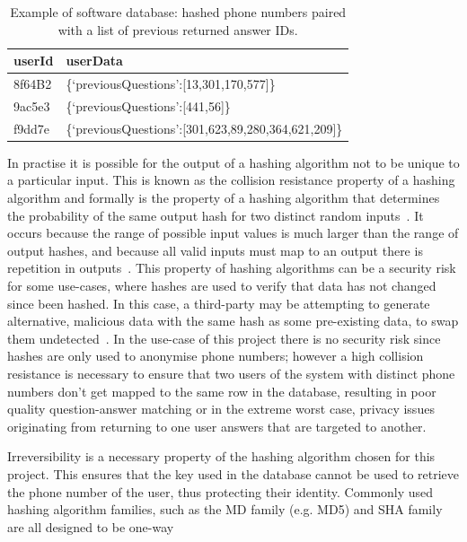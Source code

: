 \documentclass[authoryearcitations]{UoYCSproject}
\begin{document}
\begin{table}
\begin{center}
    \begin{tabular}{| l | l |}
    \hline
    userId & userData \\ \hline
    8f64B2 & \{‘previousQuestions’:[13,301,170,577]\} \\ \hline
    9ac5e3 & \{‘previousQuestions’:[441,56]\} \\ \hline
    f9dd7e & \{‘previousQuestions’:[301,623,89,280,364,621,209]\} \\
    \hline
    \end{tabular}
    \caption{Example of software database: hashed phone numbers paired with a list of previous returned answer IDs. }
    \label{table:hashDatabase}
\end{center}
\end{table}

In practise it is possible for the output of a hashing algorithm not to be unique to a particular input.  This is known as the collision resistance property of a hashing algorithm and formally is the property of a hashing algorithm that determines the probability of the same output hash for two distinct random inputs~\cite{mitCryptographyMd5}.  It occurs because the range of possible input values is much larger than the range of output hashes, and because all valid inputs must map to an output there is repetition in outputs~\cite{mitCryptographyMd5}.  This property of hashing algorithms can be a security risk for some use-cases, where hashes are used to verify that data has not changed since been hashed.  In this case, a third-party may be attempting to generate alternative, malicious data with the same hash as some pre-existing data, to swap them undetected~\cite{securityEngineeringHashingAnderson}.  In the use-case of this project there is no security risk since hashes are only used to anonymise phone numbers; however a high collision resistance is necessary to ensure that two users of the system with distinct phone numbers don't get mapped to the same row in the database, resulting in poor quality question-answer matching or in the extreme worst case, privacy issues originating from returning to one user answers that are targeted to another.

Irreversibility is a necessary property of the hashing algorithm chosen for this project.  This ensures that the key used in the database cannot be used to retrieve the phone number of the user, thus protecting their identity.  Commonly used hashing algorithm families, such as the MD family (e.g. MD5) and SHA family are all designed to be one-way~\cite{schneierCryptanalysisMD5SHA}
\end{document}
